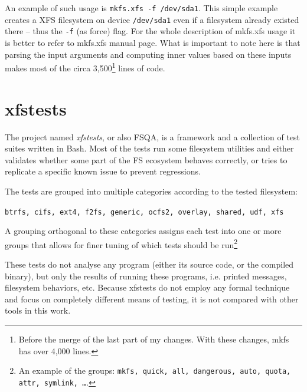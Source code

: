 An example of such usage is {\tt mkfs.xfs -f /dev/sda1}. This simple
example creates a XFS filesystem on device {\tt /dev/sda1} even if a
filesystem already existed there -- thus the {\tt -f} (as force) flag. For the whole description of mkfs.xfs usage it is better to refer to mkfs.xfs manual page. What is important to note here is that parsing the input arguments and computing inner values based on these inputs makes most of the circa 3,500\footnote{Before the merge of the last part of my changes. With these changes, mkfs has over 4,000 lines.} lines of code.


\section{xfstests}\label{chap:xfs:xfstests}

The project named {\em xfstests}, or also FSQA, is a framework and a
collection of test suites written in Bash. Most of the tests run some
filesystem utilities and either validates whether some part of the FS
ecosystem behaves correctly, or tries to replicate a specific known issue
to prevent regressions.

The tests are grouped into multiple categories according to the tested filesystem:

{\tt btrfs, cifs, ext4, f2fs, generic, ocfs2, overlay, shared, udf, xfs}

A grouping orthogonal to these categories assigns each test into one or
more groups that allows for finer tuning of which tests should be
run\footnote{An example of the groups: {\tt mkfs, quick, all, dangerous,
auto, quota, attr, symlink, \ldots}.}

These tests do not analyse any program (either its source code, or the
compiled binary), but only the results of running these programs, i.e.
printed messages, filesystem behaviors, etc. Because xfstests do not employ any
formal technique and focus on completely different means of testing, it is
not compared with other tools in this work.
